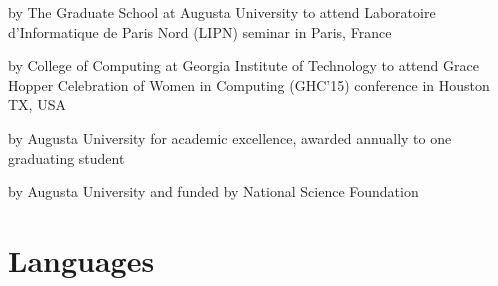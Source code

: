 \documentclass[10pt,letterpaper,roman]{moderncv}
\begin{document}
{by The Graduate School at Augusta University}
{to attend Laboratoire d'Informatique de Paris Nord (LIPN) seminar in Paris, France}{}{}

{by College of Computing at Georgia Institute of Technology}
{to attend Grace Hopper Celebration of Women in Computing (GHC'15) conference in Houston TX, USA}{}{}

{by Augusta University}
{for academic excellence, awarded annually to one graduating student}{}{}

{by Augusta University and funded by National Science Foundation}
{}{}{}




\section{Languages}







\end{document}

